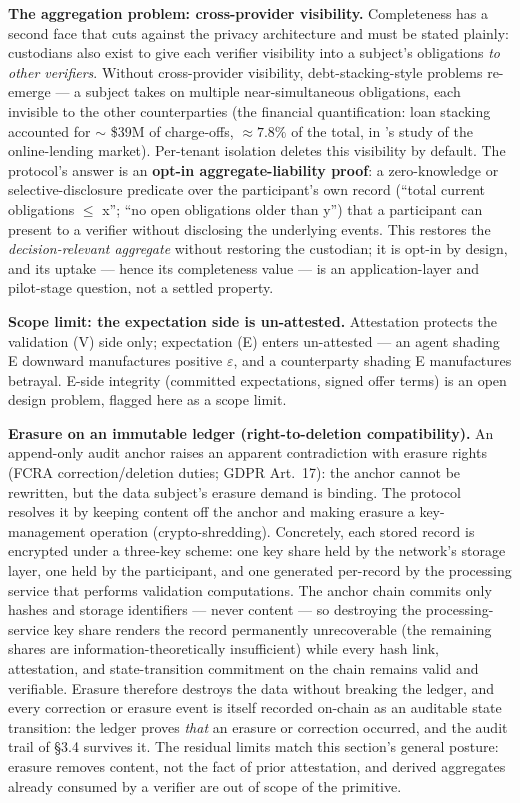 \documentclass[11pt,twocolumn]{article}
\begin{document}
\textbf{The aggregation problem: cross-provider visibility.}
Completeness has a second face that cuts against the privacy architecture and must be stated plainly: custodians also exist to give
each verifier visibility into a subject's obligations \emph{to other
verifiers}. Without cross-provider visibility, debt-stacking-style
problems re-emerge --- a subject takes on multiple near-simultaneous
obligations, each invisible to the other counterparties (the financial
quantification: loan stacking accounted for \(\sim\) \$39M of
charge-offs, \(\approx 7.8\%\) of the total, in
\citeauthor{transunion2015}'s \citeyear{transunion2015} study of the
online-lending market). Per-tenant isolation deletes this visibility by
default. The protocol's answer is an \textbf{opt-in aggregate-liability
proof}: a zero-knowledge or selective-disclosure predicate over the
participant's own record (``total current obligations \(\leq\) x''; ``no
open obligations older than y'') that a participant can present to a
verifier without disclosing the underlying events. This restores the
\emph{decision-relevant aggregate} without restoring the custodian; it
is opt-in by design, and its uptake --- hence its completeness value ---
is an application-layer and pilot-stage question, not a settled
property.

\textbf{Scope limit: the expectation side is un-attested.} Attestation
protects the validation (V) side only; expectation (E) enters
un-attested --- an agent shading E downward manufactures positive
\(\varepsilon\), and a counterparty shading E manufactures betrayal.
E-side integrity (committed expectations, signed offer terms) is an open
design problem, flagged here as a scope limit.

\textbf{Erasure on an immutable ledger (right-to-deletion
compatibility).} An append-only audit anchor raises an apparent
contradiction with erasure rights (FCRA correction/deletion duties;
GDPR Art.~17): the anchor cannot be rewritten, but the data subject's
erasure demand is binding. The protocol resolves it by keeping
content off the anchor and making erasure a key-management operation
(crypto-shredding). Concretely, each stored record is encrypted under a
three-key scheme: one key share held by the network's storage layer, one
held by the participant, and one generated per-record by the processing
service that performs validation computations. The anchor chain commits
only hashes and storage identifiers --- never content --- so destroying
the processing-service key share renders the record permanently
unrecoverable (the remaining shares are information-theoretically
insufficient) while every hash link, attestation, and state-transition
commitment on the chain remains valid and verifiable. Erasure therefore
destroys the data without breaking the ledger, and every correction or
erasure event is itself recorded on-chain as an auditable state
transition: the ledger proves \emph{that} an erasure or correction
occurred, and the audit trail of §3.4 survives it. The residual limits
match this section's general posture: erasure removes content, not the
fact of prior attestation, and derived aggregates already consumed by a
verifier are out of scope of the primitive.
\end{document}
